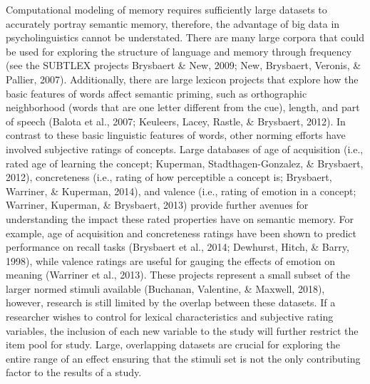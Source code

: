 \documentclass[english,,man]{apa6}
\begin{document}
Computational modeling of memory requires sufficiently large datasets to accurately portray semantic memory, therefore, the advantage of big data in psycholinguistics cannot be understated. There are many large corpora that could be used for exploring the structure of language and memory through frequency (see the SUBTLEX projects Brysbaert \& New, 2009; New, Brysbaert, Veronis, \& Pallier, 2007). Additionally, there are large lexicon projects that explore how the basic features of words affect semantic priming, such as orthographic neighborhood (words that are one letter different from the cue), length, and part of speech (Balota et al., 2007; Keuleers, Lacey, Rastle, \& Brysbaert, 2012). In contrast to these basic linguistic features of words, other norming efforts have involved subjective ratings of concepts. Large databases of age of acquisition (i.e., rated age of learning the concept; Kuperman, Stadthagen-Gonzalez, \& Brysbaert, 2012), concreteness (i.e., rating of how perceptible a concept is; Brysbaert, Warriner, \& Kuperman, 2014), and valence (i.e., rating of emotion in a concept; Warriner, Kuperman, \& Brysbaert, 2013) provide further avenues for understanding the impact these rated properties have on semantic memory. For example, age of acquisition and concreteness ratings have been shown to predict performance on recall tasks (Brysbaert et al., 2014; Dewhurst, Hitch, \& Barry, 1998), while valence ratings are useful for gauging the effects of emotion on meaning (Warriner et al., 2013). These projects represent a small subset of the larger normed stimuli available (Buchanan, Valentine, \& Maxwell, 2018), however, research is still limited by the overlap between these datasets. If a researcher wishes to control for lexical characteristics and subjective rating variables, the inclusion of each new variable to the study will further restrict the item pool for study. Large, overlapping datasets are crucial for exploring the entire range of an effect ensuring that the stimuli set is not the only contributing factor to the results of a study.
\end{document}
